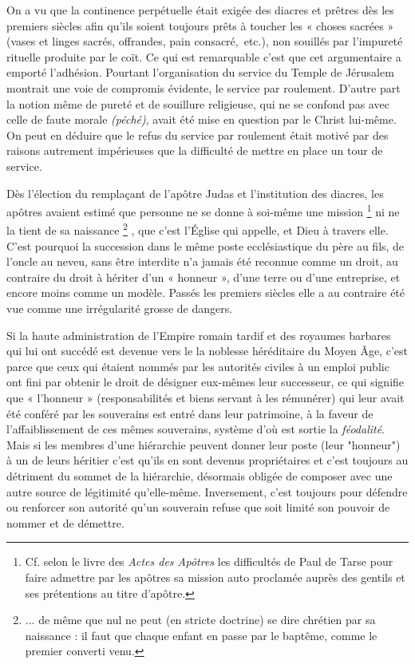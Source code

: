  On a vu que la continence perpétuelle était exigée des diacres et prêtres dès les premiers siècles afin qu'ils soient toujours prêts à toucher les « choses sacrées » (vases et linges sacrés, offrandes, pain consacré,~etc.), non souillés par l'impureté rituelle produite par le coït. Ce qui est remarquable c'est que cet argumentaire a emporté l'adhésion. Pourtant l'organisation du service du Temple de Jérusalem montrait une voie de compromis évidente, le service par roulement. D'autre part la notion même de pureté et de souillure religieuse, qui ne se confond pas avec celle de faute morale \emph{(péché)}, avait été mise en question par le Christ lui-même. On peut en déduire que le refus du service par roulement était motivé par des raisons autrement impérieuses que la difficulté de mettre en place un tour de service. 

 Dès l'élection du remplaçant de l'apôtre Judas et l'institution des diacres, les apôtres avaient estimé que personne ne se donne à soi-même une mission%
\footnote{Cf. selon le livre des \emph{Actes des Apôtres} les difficultés de Paul de Tarse pour faire admettre par les apôtres sa mission auto proclamée auprès des gentils et ses prétentions au titre d'apôtre.} 
ni ne la tient de sa naissance%
\footnote{... de même que nul ne peut (en stricte doctrine) se dire chrétien par sa naissance : il faut que chaque enfant en passe par le baptême, comme le premier converti venu.}%
, que c'est l'Église qui appelle, et Dieu à travers elle. C'est pourquoi la succession dans le même poste ecclésiastique du père au fils, de l'oncle au neveu, sans être interdite n'a jamais été reconnue comme un droit, au contraire du droit à hériter d'un « honneur », d'une terre ou d'une entreprise, et encore moins comme un modèle. Passés les premiers siècles elle a au contraire été vue comme une irrégularité grosse de dangers. 

 Si la haute administration de l'Empire romain tardif et des royaumes barbares qui lui ont succédé est devenue vers le  la noblesse héréditaire du Moyen Âge, c'est parce que ceux qui étaient nommés par les autorités civiles à un emploi public ont fini par obtenir le droit de désigner eux-mêmes leur successeur, ce qui signifie que « l'honneur » (responsabilités et biens servant à les rémunérer) qui leur avait été conféré par les souverains est entré dans leur patrimoine, à la faveur de l'affaiblissement de ces mêmes souverains, système d'où est sortie la \emph{féodalité}. Mais si les membres d'une hiérarchie peuvent donner leur poste (leur "honneur") à un de leurs héritier c'est qu'ils en sont devenus propriétaires et c'est toujours au détriment du sommet de la hiérarchie, désormais obligée de composer avec une autre source de légitimité qu'elle-même. Inversement, c'est toujours pour défendre ou renforcer son autorité qu'un souverain refuse que soit limité son pouvoir de nommer et de démettre.
 
